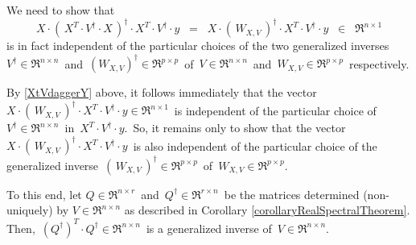 \begin{enumerate}
	We need to show that
	\begin{equation*}
	X \cdot \left(\,X^{T} \cdot V^{\dagger} \cdot X\,\right)^{\dagger} \cdot X^{T} \cdot V^{\dagger} \cdot y
	\;\; = \;\;
		X \cdot \left(\,W_{X,V}\,\right)^{\dagger} \cdot X^{T} \cdot V^{\dagger} \cdot y
	\;\; \in \;\; \Re^{n \times 1}
	\end{equation*}
	is in fact independent of the particular choices of the two generalized inverses
	\,$V^{\dagger} \in \Re^{n \times n}$\, and \,$(W_{X,V})^{\dagger} \in \Re^{p \times p}$\,
	of \,$V \in \Re^{n \times n}$\, and \,$W_{X,V} \in \Re^{p \times p}$\, respectively.

	By \eqref{XtVdaggerY} above, it follows immediately that the vector
	\,$X \cdot \left(\,W_{X,V}\,\right)^{\dagger} \cdot X^{T} \cdot V^{\dagger} \cdot y \in \Re^{n \times 1}$\,
	is independent of the particular choice of
	\,$V^{\dagger} \in \Re^{n \times n}$\, in \,$X^{T} \cdot V^{\dagger} \cdot y$.\,
	So, it remains only to show that the vector
	\,$X \cdot \left(\,W_{X,V}\,\right)^{\dagger} \cdot X^{T} \cdot V^{\dagger} \cdot y$\,
	is also independent of the particular choice of the generalized inverse
	\,$\left(\,W_{X,V}\,\right)^{\dagger}  \in \Re^{p \times p}$\,
	of \,$W_{X,V} \in \Re^{p \times p}$.

	To this end, let $Q \in \Re^{n \times r}$\, and \,$Q^{\dagger} \in \Re^{r \times n}$\,
	be the matrices determined (non-uniquely) by $V \in \Re^{n \times n}$
	as described in Corollary \ref{corollaryRealSpectralTheorem}.
	Then, \,$(Q^{\dagger})^{T} \cdot Q^{\dagger} \in \Re^{n \times n}$\,
	is a generalized inverse of \,$V \in \Re^{n \times n}$.


\end{enumerate}
